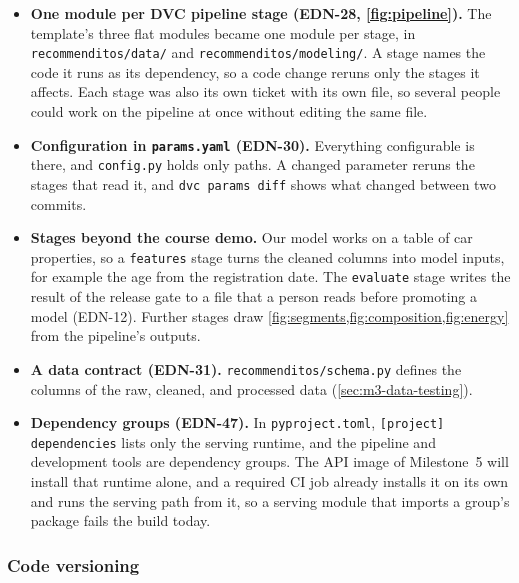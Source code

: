 \begin{itemize}
  \item \textbf{One module per DVC pipeline stage (EDN-28, \cref{fig:pipeline}).} The template's three flat modules became one module per stage, in \texttt{recommenditos/\allowbreak data/} and \texttt{recommenditos/\allowbreak modeling/}. A stage names the code it runs as its dependency, so a code change reruns only the stages it affects. Each stage was also its own ticket with its own file, so several people could work on the pipeline at once without editing the same file.
  \item \textbf{Configuration in \texttt{params.yaml} (EDN-30).} Everything configurable is there, and \texttt{config.py} holds only paths. A changed parameter reruns the stages that read it, and \texttt{dvc params diff} shows what changed between two commits.
  \item \textbf{Stages beyond the course demo.} Our model works on a table of car properties, so a \texttt{features} stage turns the cleaned columns into model inputs, for example the age from the registration date. The \texttt{evaluate} stage writes the result of the release gate to a file that a person reads before promoting a model (EDN-12). Further stages draw \cref{fig:segments,fig:composition,fig:energy} from the pipeline's outputs.
  \item \textbf{A data contract (EDN-31).} \texttt{recommenditos/schema.py} defines the columns of the raw, cleaned, and processed data (\cref{sec:m3-data-testing}).
  \item \textbf{Dependency groups (EDN-47).} In \texttt{pyproject.toml}, \texttt{[project] dependencies} lists only the serving runtime, and the pipeline and development tools are dependency groups. The API image of Milestone~5 will install that runtime alone, and a required CI job already installs it on its own and runs the serving path from it, so a serving module that imports a group's package fails the build today.
\end{itemize}

\subsubsection{Code versioning}
\label{sec:m2-code-versioning}

